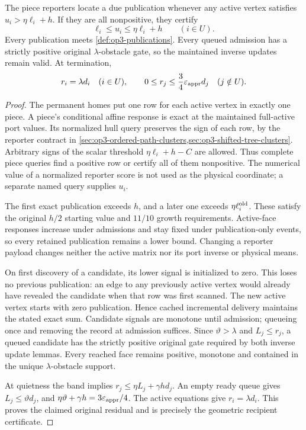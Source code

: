 \begin{lemma}
\label{lem:op3-coarse-publication-producer}
The piece reporters locate a due publication whenever any active vertex
satisfies $u_i>\eta\ell_i+h$. If they are all nonpositive, they certify
\[
 \ell_i\leq u_i\leq\eta\ell_i+h\qquad(i\in U).
\]
Every publication meets \cref{def:op3-publications}. Every queued admission
has a strictly positive original $\lambda$-obstacle gate, so the maintained
inverse updates remain valid. At termination,
\begin{equation}
 r_i=\lambda d_i\quad(i\in U),\qquad
 0\leq r_j\leq\frac34\varepsilon_{\mathrm{appr}} d_j\quad(j\notin U).
 \label{eq:op3-produced-acl-certificate}
\end{equation}
\end{lemma}
\begin{proof}
The permanent homes put one row for each active vertex in exactly one
piece. A piece's conditional affine response is exact at the maintained
full-active port values. Its normalized hull query preserves the sign of
each row, by the reporter contract in
\cref{sec:op3-ordered-path-clusters,sec:op3-shifted-tree-clusters}.
Arbitrary signs of the scalar threshold $\eta\ell_i+h-C$ are allowed.
Thus complete piece queries find a positive row or certify all of them
nonpositive. The numerical value of a normalized reporter score is not
used as the physical coordinate; a separate named query supplies $u_i$.

The first exact publication exceeds $h$, and a later one exceeds
$\eta\ell_i^{\rm old}$. These satisfy the original $h/2$ starting value
and $11/10$ growth requirements. Active-face responses increase under
admissions and stay fixed under publication-only events, so every retained
publication remains a lower bound. Changing a reporter payload changes
neither the active matrix nor its port inverse or physical means.

On first discovery of a candidate, its lower signal is initialized to
zero. This loses no previous publication: an edge to any previously active
vertex would already have revealed the candidate when that row was first
scanned. The new active vertex starts with zero publication. Hence cached
incremental delivery maintains the stated exact sum. Candidate signals
are monotone until admission; queueing once and removing the record at
admission suffices. Since $\vartheta>\lambda$ and $L_j\leq r_j$, a queued
candidate has the strictly positive original gate required by both inverse
update lemmas. Every reached face remains positive, monotone and contained
in the unique $\lambda$-obstacle support.

At quietness the band implies
$r_j\leq\eta L_j+\gamma h d_j$. An empty ready queue gives
$L_j\leq\vartheta d_j$, and
$\eta\vartheta+\gamma h=3\varepsilon_{\mathrm{appr}}/4$.
The active equations give $r_i=\lambda d_i$. This proves the claimed
original residual and is precisely the geometric recipient certificate.
\end{proof}

